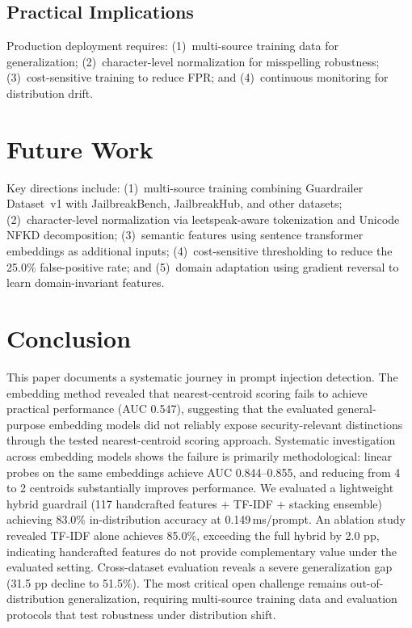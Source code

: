 \documentclass[12pt,a4paper]{article}
\begin{document}
\subsection{Practical Implications}

Production deployment requires: (1)~multi-source training data for generalization; (2)~character-level normalization for misspelling robustness; (3)~cost-sensitive training to reduce FPR; and (4)~continuous monitoring for distribution drift.

\section{Future Work}\label{sec:future}

Key directions include: (1)~multi-source training combining Guardrailer Dataset~v1 with JailbreakBench, JailbreakHub, and other datasets; (2)~character-level normalization via leetspeak-aware tokenization and Unicode NFKD decomposition; (3)~semantic features using sentence transformer embeddings as additional inputs; (4)~cost-sensitive thresholding to reduce the 25.0\% false-positive rate; and (5)~domain adaptation using gradient reversal to learn domain-invariant features.

\section{Conclusion}\label{sec:conclusion}

This paper documents a systematic journey in prompt injection detection. The embedding method revealed that nearest-centroid scoring fails to achieve practical performance (AUC 0.547), suggesting that the evaluated general-purpose embedding models did not reliably expose security-relevant distinctions through the tested nearest-centroid scoring approach. Systematic investigation across embedding models shows the failure is primarily methodological: linear probes on the same embeddings achieve AUC 0.844--0.855, and reducing from 4 to 2 centroids substantially improves performance. We evaluated a lightweight hybrid guardrail (117 handcrafted features + TF-IDF + stacking ensemble) achieving 83.0\% in-distribution accuracy at 0.149\,ms/prompt. An ablation study revealed TF-IDF alone achieves 85.0\%, exceeding the full hybrid by 2.0 pp, indicating handcrafted features do not provide complementary value under the evaluated setting. Cross-dataset evaluation reveals a severe generalization gap (31.5 pp decline to 51.5\%). The most critical open challenge remains out-of-distribution generalization, requiring multi-source training data and evaluation protocols that test robustness under distribution shift.
\end{document}
